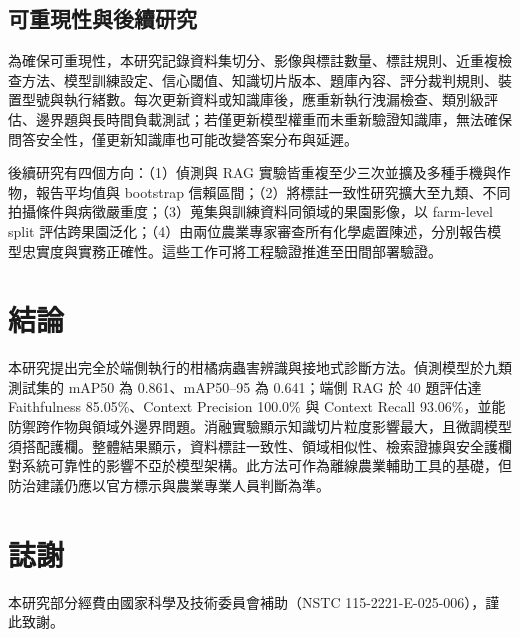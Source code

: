 \documentclass[10pt,twocolumn,a4paper]{article}
\begin{document}
\subsection{可重現性與後續研究}
為確保可重現性，本研究記錄資料集切分、影像與標註數量、標註規則、近重複檢查方法、模型訓練設定、信心閾值、知識切片版本、題庫內容、評分裁判規則、裝置型號與執行緒數。每次更新資料或知識庫後，應重新執行洩漏檢查、類別級評估、邊界題與長時間負載測試；若僅更新模型權重而未重新驗證知識庫，無法確保問答安全性，僅更新知識庫也可能改變答案分布與延遲。

後續研究有四個方向：（1）偵測與 RAG 實驗皆重複至少三次並擴及多種手機與作物，報告平均值與 bootstrap 信賴區間；（2）將標註一致性研究擴大至九類、不同拍攝條件與病徵嚴重度；（3）蒐集與訓練資料同領域的果園影像，以 farm-level split 評估跨果園泛化；（4）由兩位農業專家審查所有化學處置陳述，分別報告模型忠實度與實務正確性。這些工作可將工程驗證推進至田間部署驗證。

\section{結論}
本研究提出完全於端側執行的柑橘病蟲害辨識與接地式診斷方法。偵測模型於九類測試集的 mAP50 為 0.861、mAP50–95 為 0.641；端側 RAG 於 40 題評估達 Faithfulness 85.05\%、Context Precision 100.0\% 與 Context Recall 93.06\%，並能防禦跨作物與領域外邊界問題。消融實驗顯示知識切片粒度影響最大，且微調模型須搭配護欄。整體結果顯示，資料標註一致性、領域相似性、檢索證據與安全護欄對系統可靠性的影響不亞於模型架構。此方法可作為離線農業輔助工具的基礎，但防治建議仍應以官方標示與農業專業人員判斷為準。

\section{誌謝}
本研究部分經費由國家科學及技術委員會補助（NSTC 115-2221-E-025-006），謹此致謝。
\end{document}
